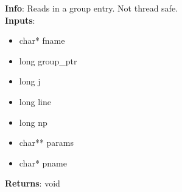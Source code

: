 \textbf{Info}: Reads in a group entry. Not thread safe.\\

\noindent \textbf{Inputs}:
\begin{itemize}
\item{char* fname}
\item{long group\_ptr}
\item{long j}
\item{long line}
\item{long np}
\item{char** params}
\item{char* pname}
\end{itemize}

\noindent \textbf{Returns}: void
